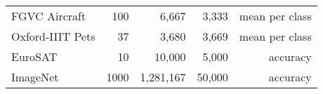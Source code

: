 \documentclass{article} \usepackage{iclr2023_conference,times}
\begin{document}
\begin{table}
\begin{center}
\begin{tabular}{lrrrr}
			FGVC Aircraft                   & 100                             & 6,667                              & 3,333                             & mean per class                            \\
			Oxford-IIIT Pets                & 37                              & 3,680                              & 3,669                             & mean per class                            \\
			EuroSAT                         & 10                              & 10,000                             & 5,000                             & accuracy                                  \\
			ImageNet                        & 1000                            & 1,281,167                          & 50,000                            & accuracy                                  \\
			\bottomrule
		\end{tabular}
	\end{center}
\end{table}
\end{document}
